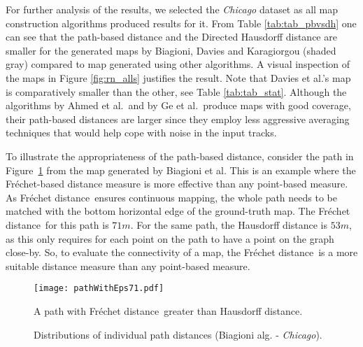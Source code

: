 \documentclass[natbib]{svjour3}                    \smartqed  \usepackage[table]{xcolor}
\newcommand{\Frd}{Fr\'echet distance}
\begin{document}
For further analysis of the results, we selected the \emph{Chicago} dataset as all map construction algorithms produced results for it.
From Table \ref{tab:tab_pbvsdh} one can see that the path-based distance and the Directed Hausdorff distance are smaller for the generated maps by Biagioni, Davies and Karagiorgou (shaded gray) compared to map generated using other algorithms. A visual inspection of the maps in Figure \ref{fig:rn_alls} justifies the result. Note that Davies et al.'s \cite{Davies:2006:SDR:1175887.1176088} map is comparatively smaller than the other, see Table \ref{tab:tab_stat}.
Although the algorithms by Ahmed et al.\ and by Ge et al.\ produce maps with good coverage, their path-based distances are larger since they employ less aggressive averaging techniques that would help cope with noise in the input tracks.


To illustrate the appropriateness of the path-based distance, consider the path in Figure~\ref{fig:james_larger_fr} from the map generated by Biagioni et al. This is an example where the Fr\'echet-based distance measure is more effective than any point-based measure. As \Frd\ ensures continuous mapping, the whole path needs to be matched with the bottom horizontal edge of the ground-truth map. The \Frd\ for this path is $71m$. For the same path, the Hausdorff distance is $53m$, as this only requires for each point on the path to have a point on the graph close-by. So, to evaluate the connectivity of a map, the \Frd\ is a more suitable distance measure than any point-based measure.

\begin{figure}[htbp]
\begin{center} 	
\texttt{[image: pathWithEps71.pdf]}
\caption{A path with \Frd\ greater than Hausdorff distance.}
\label{fig:james_larger_fr}
\end{center}
\vspace*{-2ex}
\end{figure}


\begin{figure}[htbp]
\begin{center}
 \end{center}
 \caption{Distributions of individual path distances (Biagioni alg. - \emph{Chicago}).}
 \label{fig:distribution}
\vspace*{-2ex}
\end{figure}
\end{document}
